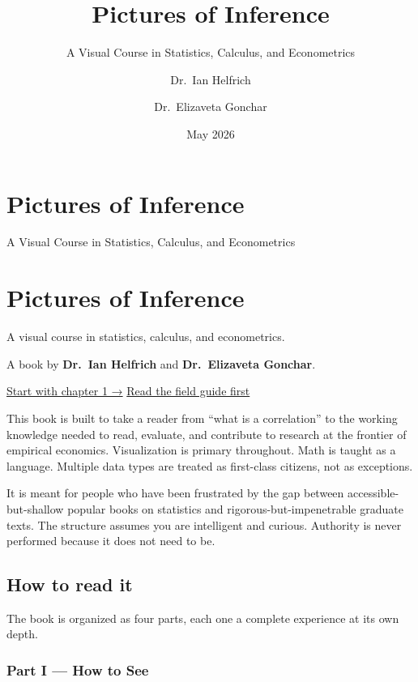 \documentclass[
  letterpaper,
  11pt,
  twoside,
  openany]{scrbook}
\title{Pictures of Inference}
\subtitle{A Visual Course in Statistics, Calculus, and Econometrics}
\author{Dr.~Ian Helfrich \and Dr.~Elizaveta Gonchar}
\date{May 2026}
\begin{document}
\frontmatter
\maketitle


\mainmatter
{}

\chapter{Pictures of Inference}\label{pictures-of-inference}

A Visual Course in Statistics, Calculus, and Econometrics

\hfill\break


\chapter{Pictures of Inference}\label{pictures-of-inference-1}

A visual course in statistics, calculus, and econometrics.

A book by \textbf{Dr.~Ian Helfrich} and \textbf{Dr.~Elizaveta Gonchar}.

\href{prose/part1/01-numbers-on-the-page.qmd}{Start with chapter 1 →}
\href{prose/front/field-guide.qmd}{Read the field guide first}

This book is built to take a reader from ``what is a correlation'' to
the working knowledge needed to read, evaluate, and contribute to
research at the frontier of empirical economics. Visualization is
primary throughout. Math is taught as a language. Multiple data types
are treated as first-class citizens, not as exceptions.

It is meant for people who have been frustrated by the gap between
accessible-but-shallow popular books on statistics and
rigorous-but-impenetrable graduate texts. The structure assumes you are
intelligent and curious. Authority is never performed because it does
not need to be.

\section{How to read it}\label{how-to-read-it}

The book is organized as four parts, each one a complete experience at
its own depth.

\subsection{Part I --- How to See}\label{part-i-how-to-see}
\end{document}
